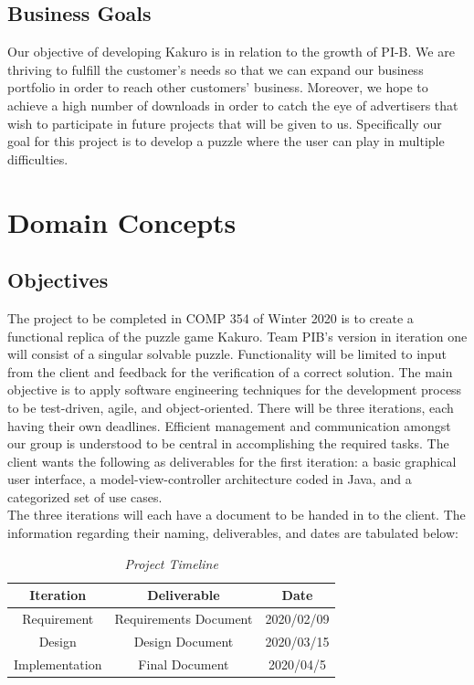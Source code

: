 \documentclass[12pt]{article}
\begin{document}
\subsection{Business Goals}

\hspace{\parindent} Our objective of developing Kakuro is in relation to the growth of PI-B. We are thriving to fulfill the customer’s needs so that we can expand our business portfolio in order to reach other customers’ business. Moreover, we hope to achieve a high number of downloads in order to catch the eye of advertisers that wish to participate in future projects that will be given to us. Specifically our goal for this project is to develop a puzzle where the user can play in multiple difficulties. 

\clearpage

\clearpage

\section{Domain Concepts}
\subsection{Objectives}

The project to be completed in COMP 354 of Winter 2020 is to create a functional replica of the puzzle game Kakuro. Team PIB's version in iteration one will consist of a singular solvable puzzle. Functionality will be limited to input from the client and feedback for the verification of a correct solution. The main objective is to apply software engineering techniques for the development process to be test-driven, agile, and object-oriented. There will be three iterations, each having their own deadlines. Efficient management and communication amongst our group is understood to be central in accomplishing the required tasks. The client wants the following as deliverables for the first iteration: a basic graphical user interface, a model-view-controller architecture coded in Java, and a categorized set of use cases.\\  
The three iterations will each have a document to be handed in to the client. The information regarding their naming, deliverables, and dates are tabulated below:\\

\begin{table}[htbp]
\begin{center}
\begin{tabular}{| c | c | c |}
\hline
\cellcolor{gray}Iteration & \cellcolor{gray}Deliverable & \cellcolor{gray} Date \\
\hline
Requirement & Requirements Document & 2020/02/09 \\
\hline
Design & Design Document & 2020/03/15 \\
\hline
Implementation & Final Document & 2020/04/5 \\
\hline
\end{tabular}
\caption*{\textit {Project Timeline}}
\end{center}
\end{table}
\end{document}
